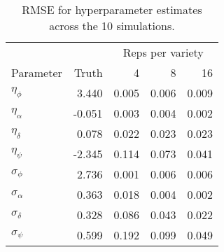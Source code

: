 \begin{table}[ht]
\centering
\caption{RMSE for hyperparameter estimates across the 10 simulations.} 
\label{t:hyperparameter}
\begin{tabular}{lrrrr}
  \hline
& & \multicolumn{3}{c}{Reps per variety} \\
Parameter & Truth & 4 & 8 & 16 \\ 
  \hline
$\eta_\phi$ & 3.440 & 0.005 & 0.006 & 0.009 \\ 
  $\eta_\alpha$ & -0.051 & 0.003 & 0.004 & 0.002 \\ 
  $\eta_\delta$ & 0.078 & 0.022 & 0.023 & 0.023 \\ 
  $\eta_\psi$ & -2.345 & 0.114 & 0.073 & 0.041 \\ 
   \hline
$\sigma_\phi$ & 2.736 & 0.001 & 0.006 & 0.006 \\ 
  $\sigma_\alpha$ & 0.363 & 0.018 & 0.004 & 0.002 \\ 
  $\sigma_\delta$ & 0.328 & 0.086 & 0.043 & 0.022 \\ 
  $\sigma_\psi$ & 0.599 & 0.192 & 0.099 & 0.049 \\ 
   \hline
\end{tabular}
\end{table}
